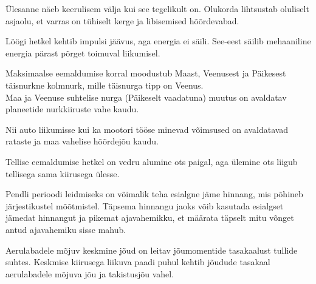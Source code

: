 \documentclass[10pt]{article}
\begin{document}
{
\hint
Ülesanne näeb keerulisem välja kui see tegelikult on. Olukorda lihtsustab oluliselt asjaolu, et varras on tühiselt kerge ja libisemised hõõrdevabad.
\probend
\bigskip


\hint
Löögi hetkel kehtib impulsi jäävus, aga energia ei säili. See-eest säilib mehaaniline energia pärast põrget toimuval liikumisel.
\probend
\bigskip


\hint
\osa Maksimaalse eemaldumise korral moodustub Maast, Veenusest ja Päikesest täisnurkne kolmnurk, mille täisnurga tipp on Veenus.\\
\osa Maa ja Veenuse suhtelise nurga (Päikeselt vaadatuna) muutus on avaldatav planeetide nurkkiiruste vahe kaudu.
\probend
\bigskip


\hint
Nii auto liikumisse kui ka mootori tööse minevad võimsused on avaldatavad rataste ja maa vahelise hõõrdejõu kaudu.
\probend
\bigskip


\hint
Tellise eemaldumise hetkel on vedru alumine ots paigal, aga ülemine ots liigub tellisega sama kiirusega ülesse.
\probend
\bigskip


\hint
Pendli perioodi leidmiseks on võimalik teha esialgne jäme hinnang, mis põhineb järjestikustel mõõtmistel. Täpsema hinnangu jaoks võib kasutada esialgset jämedat hinnangut ja pikemat ajavahemikku, et määrata täpselt mitu võnget antud ajavahemiku sisse mahub.
\probend
\bigskip


\hint
Aerulabadele mõjuv keskmine jõud on leitav jõumomentide tasakaalust tullide suhtes. Keskmise kiirusega liikuva paadi puhul kehtib jõudude tasakaal aerulabadele mõjuva jõu ja takistusjõu vahel.
\probend
\bigskip

}
\end{document}
